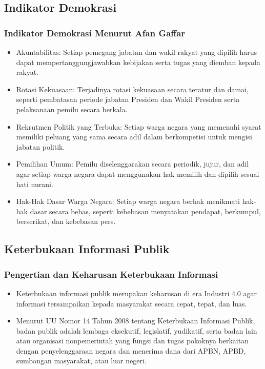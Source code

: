 \subsection{Indikator Demokrasi}

\subsubsection{Indikator Demokrasi Menurut Afan Gaffar}
\begin{itemize}
\item Akuntabilitas: Setiap pemegang jabatan dan wakil rakyat yang dipilih harus dapat mempertanggungjawabkan kebijakan serta tugas yang diemban kepada rakyat.
\item Rotasi Kekuasaan: Terjadinya rotasi kekuasaan secara teratur dan damai, seperti pembatasan periode jabatan Presiden dan Wakil Presiden serta pelaksanaan pemilu secara berkala.
\item Rekrutmen Politik yang Terbuka: Setiap warga negara yang memenuhi syarat memiliki peluang yang sama secara adil dalam berkompetisi untuk mengisi jabatan politik.
\item Pemilihan Umum: Pemilu diselenggarakan secara periodik, jujur, dan adil agar setiap warga negara dapat menggunakan hak memilih dan dipilih sesuai hati nurani.
\item Hak-Hak Dasar Warga Negara: Setiap warga negara berhak menikmati hak-hak dasar secara bebas, seperti kebebasan menyatakan pendapat, berkumpul, berserikat, dan kebebasan pers.
\end{itemize}

\subsection{Keterbukaan Informasi Publik}

\subsubsection{Pengertian dan Keharusan Keterbukaan Informasi}
\begin{itemize}
\item Keterbukaan informasi publik merupakan keharusan di era Industri 4.0 agar informasi tersampaikan kepada masyarakat secara cepat, tepat, dan luas.
\item Menurut UU Nomor 14 Tahun 2008 tentang Keterbukaan Informasi Publik, badan publik adalah lembaga eksekutif, legislatif, yudikatif, serta badan lain atau organisasi nonpemerintah yang fungsi dan tugas pokoknya berkaitan dengan penyelenggaraan negara dan menerima dana dari APBN, APBD, sumbangan masyarakat, atau luar negeri.
\end{itemize}

